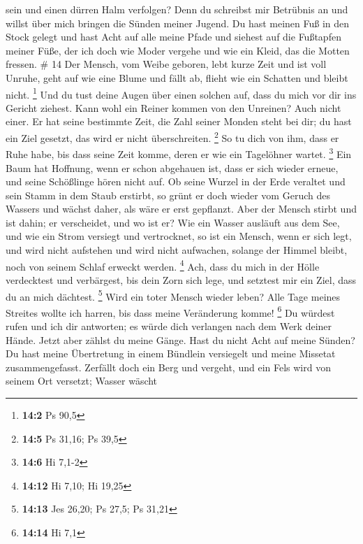 sein und einen dürren Halm verfolgen?  Denn du schreibst
mir Betrübnis an und willst über mich bringen die Sünden meiner Jugend.
 Du hast meinen Fuß in den Stock gelegt und hast Acht auf
alle meine Pfade und siehest auf die Fußtapfen meiner Füße,
 der ich doch wie Moder vergehe und wie ein Kleid, das
die Motten fressen. \# 14  Der Mensch, vom Weibe geboren,
lebt kurze Zeit und ist voll Unruhe,  geht auf wie eine
Blume und fällt ab, flieht wie ein Schatten und bleibt nicht.
\footnote{\textbf{14:2} Ps 90,5}  Und du tust deine Augen
über einen solchen auf, dass du mich vor dir ins Gericht ziehest.
 Kann wohl ein Reiner kommen von den Unreinen? Auch nicht
einer.  Er hat seine bestimmte Zeit, die Zahl seiner
Monden steht bei dir; du hast ein Ziel gesetzt, das wird er nicht
überschreiten. \footnote{\textbf{14:5} Ps 31,16; Ps 39,5} 
So tu dich von ihm, dass er Ruhe habe, bis dass seine Zeit komme, deren
er wie ein Tagelöhner wartet. \footnote{\textbf{14:6} Hi 7,1-2}
 Ein Baum hat Hoffnung, wenn er schon abgehauen ist, dass
er sich wieder erneue, und seine Schößlinge hören nicht auf.
 Ob seine Wurzel in der Erde veraltet und sein Stamm in
dem Staub erstirbt,  so grünt er doch wieder vom Geruch
des Wassers und wächst daher, als wäre er erst gepflanzt.
 Aber der Mensch stirbt und ist dahin; er verscheidet,
und wo ist er?  Wie ein Wasser ausläuft aus dem See, und
wie ein Strom versiegt und vertrocknet,  so ist ein
Mensch, wenn er sich legt, und wird nicht aufstehen und wird nicht
aufwachen, solange der Himmel bleibt, noch von seinem Schlaf erweckt
werden. \footnote{\textbf{14:12} Hi 7,10; Hi 19,25}  Ach,
dass du mich in der Hölle verdecktest und verbärgest, bis dein Zorn sich
lege, und setztest mir ein Ziel, dass du an mich dächtest. \footnote{\textbf{14:13}
  Jes 26,20; Ps 27,5; Ps 31,21}  Wird ein toter Mensch
wieder leben? Alle Tage meines Streites wollte ich harren, bis dass
meine Veränderung komme! \footnote{\textbf{14:14} Hi 7,1}
 Du würdest rufen und ich dir antworten; es würde dich
verlangen nach dem Werk deiner Hände.  Jetzt aber zählst
du meine Gänge. Hast du nicht Acht auf meine Sünden?  Du
hast meine Übertretung in einem Bündlein versiegelt und meine Missetat
zusammengefasst.  Zerfällt doch ein Berg und vergeht, und
ein Fels wird von seinem Ort versetzt;  Wasser wäscht
